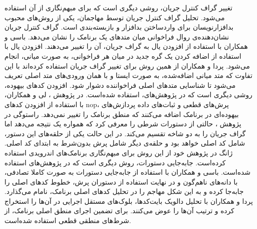 تغییر گراف کنترل جریان، روشی دیگری است که برای مبهم‌نگاری از آن استفاده می‌شود. تحلیل گراف کنترل جریان توسط مهاجمان، یکی از روش‌های محبوب بدافزارنویسان برای واردساختن بدافزار و بازبسته‌بندی است. گراف کنترل جریان نشان‌دهنده‌ی روال فراخوانی میان متد‌های یک برنامک را نشان می‌دهد. باسی و همکاران با استفاده از افزودن یال به گراف جریان، آن را تغییر می‌دهند. افزودن یال با استفاده از اضافه کردن یک گره جدید در میان هر فراخوانی، به صورت میانی، انجام می‌شود. پردا و همکاران از همین روش برای تغییر گراف جریان استفاده کرده‌اند با این تفاوت که متد میانی اضافه‌شده، به صورت ایستا و با همان ورودی‌های متد اصلی تعریف می‌شود تا شناسایی متد‌های اصلی فراخواننده دشوار شود. افزودن کد‌های بیهوده، روشی دیگری است که در پژوهش‌های، استفاده شده‌است. در پژوهش ، لی و همکاران، با استفاده از افزودن کد‌های nop، پرش‌های قطعی و ثبات‌های داده پردازش‌های بیهوده‌‌ای در برنامک اضافه می‌کنند که منطق برنامک را تغییر نمی‌دهد. راستوگی در پژوهش ، حالتی از دستورات شرطی را معرفی کرد که همواره یک نتیجه می‌دهد اما گراف جریان را به دو شاخه تقسیم می‌کند. در این حالت یکی از حلقه‌های این دستور، شامل کد اصلی خواهد بود و حلقه‌ی دیگر شامل پرش بدون‌شرط به ابتدای کد اصلی. ژانگ  در پژوهش خود از این روش برای مبهم‌نگاری برنامک‌های اندرویدی استفاده  کرده‌است. جابه‌جایی دستورات، روش دیگری است که در پژوهش‌های  استفاده شده‌است. باسی و همکاران با استفاده از جابه‌جایی دستورات به صورت کاملا تصادفی، با دانه‌های ناهم‌گون و در نهایت استفاده از دستوران پرش، خطوط کد‌های اصلی را جابه‌جا کرده و به این شکل مهاجم را در تحلیل کد‌‌های اصلی برنامک، نامام می‌گذارد. پردا و همکاران با تحلیل دالویک‌ بایت‌کد‌ها، بلوک‌های مستقل اجرایی در آن‌ها را استخراج کرده و ترتیب آن‌ها را عوض می‌کنند. برای تضمین اجرای منطق اصلی برنامک، از شرط‌های منطقی قطعی استفاده شده‌است.\\
